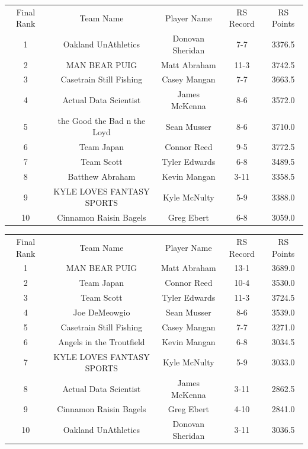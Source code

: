 \documentclass[11pt,letterpaper]{article}
\begin{document}
\vspace{-25pt}
\begin{table} [h]
\begin{center}
\begin{tabular} { c c c c c }
\\ Final Rank & Team Name & Player Name & RS Record & RS Points
\\ 1  & Oakland UnAthletics  & Donovan Sheridan & 7-7  & 3376.5
\\ 2  & MAN BEAR PUIG  & Matt Abraham & 11-3 & 3742.5
\\ 3  & Casetrain Still Fishing & Casey Mangan & 7-7 & 3663.5
\\ 4  & Actual Data Scientist & James McKenna & 8-6 & 3572.0
\\ 5  & the Good the Bad n the Loyd  & Sean Musser & 8-6  & 3710.0
\\ 6  & Team Japan & Connor Reed & 9-5 & 3772.5
\\ 7  & Team Scott & Tyler Edwards & 6-8 & 3489.5
\\ 8  & Batthew Abraham & Kevin Mangan & 3-11 & 3358.5
\\ 9  & KYLE LOVES FANTASY SPORTS & Kyle McNulty & 5-9 & 3388.0
\\ 10  & Cinnamon Raisin Bagels & Greg Ebert & 6-8 & 3059.0
\end{tabular}
\end{center}
\end{table}

\newpage
{}
\vspace{-25pt}
\begin{table} [h]
\begin{center}
\begin{tabular} { c c c c c }
\\ Final Rank & Team Name & Player Name & RS Record & RS Points
\\ 1  & MAN BEAR PUIG  & Matt Abraham & 13-1 & 3689.0
\\ 2  & Team Japan & Connor Reed & 10-4 & 3530.0
\\ 3  & Team Scott & Tyler Edwards & 11-3 & 3724.5
\\ 4  & Joe DeMeowgio & Sean Musser & 8-6  & 3539.0
\\ 5  & Casetrain Still Fishing & Casey Mangan & 7-7 & 3271.0
\\ 6  & Angels in the Troutfield & Kevin Mangan & 6-8 & 3034.5
\\ 7  & KYLE LOVES FANTASY SPORTS & Kyle McNulty & 5-9 & 3033.0
\\ 8  & Actual Data Scientist & James McKenna & 3-11 & 2862.5
\\ 9  & Cinnamon Raisin Bagels & Greg Ebert & 4-10 & 2841.0
\\ 10  & Oakland UnAthletics  & Donovan Sheridan & 3-11  & 3036.5
\end{tabular}
\end{center}
\end{table}
\end{document}
